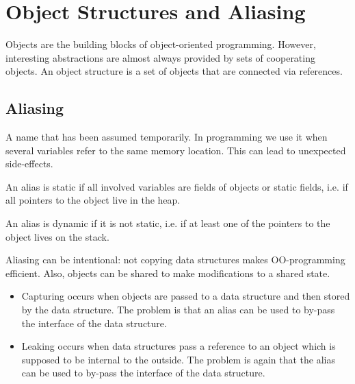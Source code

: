 \section{Object Structures and Aliasing}
\begin{mytitle} Objects are the building blocks of object-oriented programming. However, interesting abstractions are almost always provided by sets of cooperating objects. An object structure is a set of objects that are connected via references.
\end{mytitle}
\subsection{Aliasing}
\begin{mytitle}[Aliasing] A name that has been assumed temporarily. In programming we use it when several variables refer to the same memory location. This can lead to unexpected side-effects. 
\end{mytitle}
\begin{mytitle} An alias is static if all involved variables are fields of objects or static fields, i.e. if all pointers to the object live in the heap.
\end{mytitle}
\begin{mytitle} An alias is dynamic if it is not static, i.e. if at least one of the pointers to the object lives on the stack.
\end{mytitle}
\begin{mytitle} Aliasing can be intentional: not copying data structures makes OO-programming efficient. Also, objects can be shared to make modifications to a shared state.
\end{mytitle}
\begin{mytitle} \hfill
\begin{itemize}
    \item Capturing occurs when objects are passed to a data structure and then stored by the data structure. The problem is that an alias can be used to by-pass the interface of the data structure.
    \item Leaking occurs when data structures pass a reference to an object which is supposed to be internal to the outside. The problem is again that the alias can be used to by-pass the interface of the data structure.
\end{itemize}
\end{mytitle}


